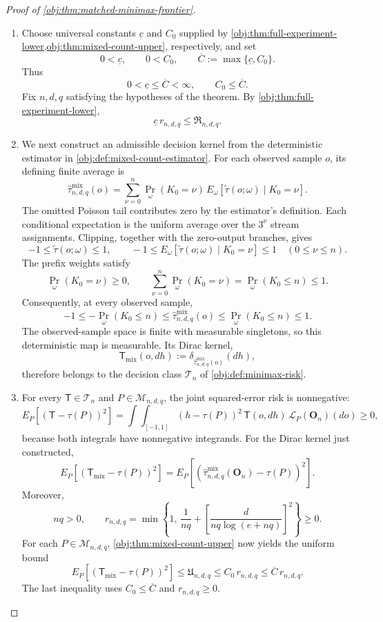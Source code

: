 \begin{proof}[Proof of \cref{obj:thm:matched-minimax-frontier}]
\begin{enumerate}
\item Choose universal constants \(\underline c\) and \(C_0\) supplied by
\cref{obj:thm:full-experiment-lower,obj:thm:mixed-count-upper}, respectively, and set
\[
0<\underline c,\qquad 0<C_0,\qquad
\overline C:=\max\{\underline c,C_0\}.
\]
Thus
\[
0<\underline c\le\overline C<\infty,
\qquad C_0\le\overline C.
\]
Fix \(n,d,q\) satisfying the hypotheses of the theorem.
By \cref{obj:thm:full-experiment-lower},
\[
\underline c\,r_{n,d,q}\le\mathfrak R_{n,d,q}.
\]

\item We next construct an admissible decision kernel from the deterministic estimator in
\cref{obj:def:mixed-count-estimator}. For each observed sample \(o\), its defining finite average is
\[
\widehat\tau^{\mathrm{mix}}_{n,d,q}(o)
=
\sum_{\nu=0}^{n}
\Pr_\omega(K_0=\nu)\,
E_\omega\!\left[
\widetilde\tau(o;\omega)\mid K_0=\nu
\right].
\]
The omitted Poisson tail contributes zero by the estimator's definition.
Each conditional expectation is the uniform average over the \(3^\nu\) stream assignments.
Clipping, together with the zero-output branches, gives
\[
-1\le \widetilde\tau(o;\omega)\le1,
\qquad
-1\le
E_\omega\!\left[
\widetilde\tau(o;\omega)\mid K_0=\nu
\right]
\le1
\quad(0\le\nu\le n).
\]
The prefix weights satisfy
\[
\Pr_\omega(K_0=\nu)\ge0,\qquad
\sum_{\nu=0}^{n}\Pr_\omega(K_0=\nu)
=\Pr_\omega(K_0\le n)\le1.
\]
Consequently, at every observed sample,
\[
-1
\le-\Pr_\omega(K_0\le n)
\le\widehat\tau^{\mathrm{mix}}_{n,d,q}(o)
\le\Pr_\omega(K_0\le n)
\le1.
\]
The observed-sample space is finite with measurable singletons, so this deterministic map is measurable. Its Dirac kernel,
\[
\mathsf T_{\mathrm{mix}}(o,dh)
:=
\delta_{\widehat\tau^{\mathrm{mix}}_{n,d,q}(o)}(dh),
\]
therefore belongs to the decision class \(\mathcal T_n\) of
\cref{obj:def:minimax-risk}.

\item For every \(\mathsf T\in\mathcal T_n\) and \(P\in\mathcal M_{n,d,q}\), the joint squared-error risk is nonnegative:
\[
E_P\!\left[(\mathsf T-\tau(P))^2\right]
=
\int\!\int_{[-1,1]}
(h-\tau(P))^2\,\mathsf T(o,dh)\,
\mathcal L_P(\mathbf O_n)(do)
\ge0,
\]
because both integrals have nonnegative integrands. For the Dirac kernel just constructed,
\[
E_P\!\left[(\mathsf T_{\mathrm{mix}}-\tau(P))^2\right]
=
E_P\!\left[
\left(
\widehat\tau^{\mathrm{mix}}_{n,d,q}(\mathbf O_n)-\tau(P)
\right)^2
\right].
\]
Moreover,
\[
nq>0,\qquad
r_{n,d,q}
=
\min\left\{
1,\,
\frac1{nq}
+
\left[\frac{d}{nq\log(e+nq)}\right]^2
\right\}
\ge0.
\]
For each \(P\in\mathcal M_{n,d,q}\),
\cref{obj:thm:mixed-count-upper} now yields the uniform bound
\[
E_P\!\left[(\mathsf T_{\mathrm{mix}}-\tau(P))^2\right]
\le \mathfrak U_{n,d,q}
\le C_0\,r_{n,d,q}
\le\overline C\,r_{n,d,q}.
\]
The last inequality uses \(C_0\le\overline C\) and \(r_{n,d,q}\ge0\).


\end{enumerate}
\end{proof}
